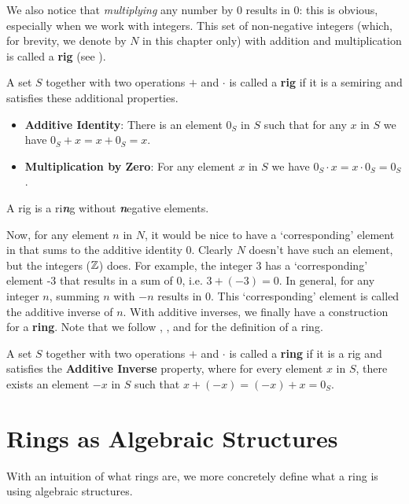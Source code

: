 We also notice that \textit{multiplying} any number by 0 results in 0: this is obvious, especially when we work with integers. This set of non-negative integers (which, for brevity, we denote by $N$ in this chapter only) with addition and multiplication is called a \textbf{rig} (see \cite{proofwiki_rig-definition}).
\begin{definition}
    A set $S$ together with two operations $+$ and $\cdot$ is called a \textbf{rig} if it is a semiring and satisfies these additional properties.
    \begin{itemize}
        \item \textbf{Additive Identity}: There is an element $0_S$ in $S$ such that for any $x$ in $S$ we have $0_S + x = x + 0_S = x$.
        \item \textbf{Multiplication by Zero}: For any element $x$ in $S$ we have $0_S \cdot x = x \cdot 0_S = 0_S$.
    \end{itemize}
\end{definition}
\begin{remark}
    A rig is a ri\textit{\textbf{n}}g without \textit{\textbf{n}}egative elements.
\end{remark}

Now, for any element $n$ in $N$, it would be nice to have a `corresponding' element in that sums to the additive identity 0. Clearly $N$ doesn't have such an element, but the integers ($\mathbb{Z}$) does. For example, the integer 3 has a `corresponding' element -3 that results in a sum of 0, i.e. $3 + (-3) = 0$. In general, for any integer $n$, summing $n$ with $-n$ results in 0. This `corresponding' element is called the additive inverse of $n$. With additive inverses, we finally have a construction for a \textbf{ring}. Note that we follow \cite[p.~223]{dummit_foote_2004}, \cite[p.~115, Definition 1.1]{hungerford_1980}, and \cite{proofwiki_ring-definition} for the definition of a ring.
\begin{definition}
    A set $S$ together with two operations $+$ and $\cdot$ is called a \textbf{ring} if it is a rig and satisfies the \textbf{Additive Inverse} property, where for every element $x$ in $S$, there exists an element $-x$ in $S$ such that $x + (-x) = (-x) + x = 0_S$.
\end{definition}

\section{Rings as Algebraic Structures}
With an intuition of what rings are, we more concretely define what a ring is using algebraic structures.

